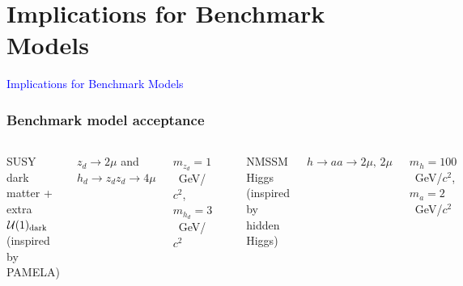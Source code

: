 \documentclass[compress]{beamer}
\newcommand{\s}[1]{{\mbox{\scriptsize #1}}}
\begin{document}
\section*{Implications for Benchmark Models}
\begin{frame}

\vfill
\begin{center}
\Huge \textcolor{blue}{Implications for Benchmark Models}
\end{center}

\vfill
\end{frame}

\begin{frame}
\frametitle{Benchmark model acceptance}

\vspace{0.5 cm}
\begin{columns}
\centering SUSY dark matter + extra $\mathcal{U}(1)_\s{dark}$ (inspired by PAMELA)

\vspace{0.1 cm}
$z_d \to 2\mu$ and $h_d \to z_dz_d \to 4\mu$

\vspace{0.1 cm}
$m_{z_d} = 1$~GeV/$c^2$, $m_{h_d} = 3$~GeV/$c^2$

\vspace{0.3 cm}
\includegraphics[width=0.6\linewidth]{chart2d_u1.png}

\centering NMSSM Higgs \\
(inspired by hidden Higgs)

\vspace{0.1 cm}
$h \to aa \to 2\mu, \, 2\mu$

\vspace{0.1 cm}
$m_h = 100$~GeV/$c^2$, $m_a = 2$~GeV/$c^2$

\vspace{0.3 cm}
\includegraphics[width=0.6\linewidth]{chart2d_NMSSM.png}
\end{columns}


\end{frame}
\end{document}
